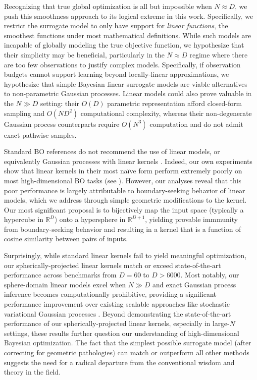\documentclass[twoside]{article}
\theoremstyle{plain}
\theoremstyle{definition}
\begin{document}
Recognizing that true global optimization is all but impossible when $N \approx D$,
we push this smoothness approach to its logical extreme in this work.
Specifically, we restrict the surrogate model to only have support for \emph{linear functions}, the smoothest functions under most mathematical definitions.
While such models are incapable of globally modeling the true objective function,
we hypothesize that their simplicity may be beneficial, particularly in the $N \approx D$ regime where there are too few observations to justify complex models.
Specifically, if observation budgets cannot support learning beyond locally-linear approximations, we hypothesize that simple Bayesian linear surrogate models are viable alternatives to non-parametric Gaussian processes.
Linear models could also prove valuable in the $N \gg D$ setting:
their $O(D)$ parametric representation afford closed-form sampling
and $O(ND^2)$ computational complexity,
whereas their non-degenerate Gaussian process counterparts require $O(N^3)$ computation and do not admit exact pathwise samples.

Standard BO references do not recommend the use of linear models, or equivalently Gaussian processes with linear kernels
\citep{frazier2018bayesian,garnett2023bayesian}.
Indeed, our own experiments show that linear kernels in their most na\"ive form perform extremely poorly on most high-dimensional BO tasks (see ).
However, our analyses reveal that this poor performance is largely attributable to boundary-seeking behavior of linear models, which we address through simple geometric modifications to the kernel.
Our most significant proposal is to bijectively map the input space (typically a hypercube in $\mathbb R^D$) onto a hypersphere in $\mathbb R^{D+1}$,
yielding provable immmunity from boundary-seeking behavior and resulting in a kernel that is a function of cosine similarity between pairs of inputs.

Surprisingly, while standard linear kernels fail to yield meaningful optimization, our spherically-projected linear kernels match or exceed state-of-the-art performance across benchmarks from $D=60$ to $D > 6000$.
Most notably, our sphere-domain linear models excel when $N \gg D$ and exact Gaussian process inference becomes computationally prohibitive, providing a significant performance improvement over existing scalable approaches like stochastic variational Gaussian processes \citep{hensman2013gaussian,vakili2021scalable,moss2023inducing}.
Beyond demonstrating the state-of-the-art performance of our spherically-projected linear kernels, especially in large-$N$ settings,
these results further question our understanding of high-dimensional Bayesian optimization.
The fact that the simplest possible surrogate model (after correcting for geometric pathologies) can match or outperform all other methods suggests the need for a radical departure from the conventional wisdom and theory in the field.
\end{document}
